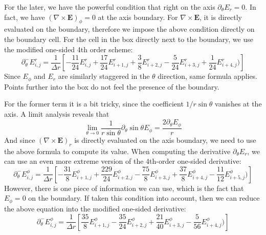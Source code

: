 For the later, we have the powerful condition that right on the axis
$\partial_{\theta}E_r = 0$. In fact, we have $(\nabla\times
\mathbf{E})_{\phi} = 0$ at the axis boundary. For $\nabla\times
\mathbf{E}$, it is directly evaluated on the boundary, therefore we
impose the above condition directly on the boundary cell. For the cell
in the box directly next to the boundary, we use the modified
one-sided 4th order scheme:
\begin{equation}
  \label{eq:1-sided-4th-order}
  \partial_{\theta}^-E_{i,j}^r = \frac{1}{\Delta r}\left[-\frac{11}{24} E_{i,j}^{r} + \frac{17}{24}E_{i+1,j}^{r} + \frac{3}{8}E^{r}_{i+2,j} - \frac{5}{24}E^{r}_{i+3,j} + \frac{1}{24}E^r_{i+4,j} )\right]
\end{equation}
Since $E_{\phi}$ and $E_r$ are similarly staggered in the $\theta$
direction, same formula applies. Points further into the box do not
feel the presence of the boundary.

For the former term it is a bit tricky, since the coefficient
$1/r\sin\theta$ vanishes at the axis. A limit analysis reveals that
\begin{equation}
  \lim_{\theta\to 0}\frac{1}{r\sin\theta}\partial_{\theta}\sin\theta E_{\phi} = \frac{2\partial_{\theta}E_{\phi}}{r}
\end{equation}
And since $(\nabla\times \mathbf{E})_r$ is directly evaluated on the
axis boundary, we need to use the above formula to compute its
value. When computing the derivative $\partial_{\theta}E_r$, we can
use an even more extreme version of the 4th-order one-sided
derivative:
\begin{equation}
  \partial_{\theta}^-E_{i,j}^\phi = \frac{1}{\Delta r}\left[-\frac{31}{8} E_{i+1,j}^{\phi} + \frac{229}{24}E_{i+2,j}^{\phi} - \frac{75}{8}E^{\phi}_{i+3,j} + \frac{37}{8}E^{\phi}_{i+4,j} - \frac{11}{12}E^\phi_{i+5,j} )\right]
\end{equation}
However, there is one piece of information we can use, which is the
fact that $E_{\phi} = 0$ on the boundary. If taken this condition into
account, then we can reduce the above equation into the modified
one-sided derivative:
\begin{equation}
  \partial_{\theta}^-E_{i,j}^\phi = \frac{1}{\Delta r}\left[\frac{35}{8} E_{i+1,j}^{\phi} - \frac{35}{24}E_{i+2,j}^{\phi} + \frac{21}{40}E^{\phi}_{i+3,j} - \frac{5}{56}E^{\phi}_{i+4,j} )\right]
\end{equation}

